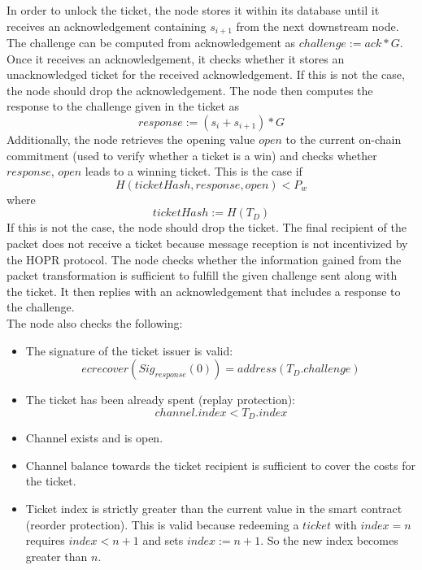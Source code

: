 In order to unlock the ticket, the node stores it within its database until it receives an acknowledgement containing $s_{i+1}$ from the next downstream node. 
The challenge can be computed from acknowledgement as $challenge:=ack*G$.
\newline Once it receives an acknowledgement, it checks whether it stores an unacknowledged ticket for the received acknowledgement. 
If this is not the case, the node should drop the acknowledgement.  
\newline The node then computes the response to the challenge given in the ticket as $$response:=(s_i+s_{i+1})*G$$
Additionally, the node retrieves the opening value $open$ to the current on-chain commitment (used to verify whether a ticket is a win) and checks whether $response$, $open$ leads to a winning ticket. 
This is the case if $$H( ticketHash, response, open ) <P_w$$ where $$ticketHash:=H(T_D)$$
If this is not the case, the node should drop the ticket. 
The final recipient of the packet does not receive a ticket because message reception is not incentivized by the HOPR protocol.
\newline The node checks whether the information gained from the packet transformation is sufficient to fulfill the given challenge sent along with the ticket. It then replies with an acknowledgement that includes a response to the challenge.
\\ The node also checks the following:
\begin{itemize}
    \item The signature of the ticket issuer is valid: $$ecrecover(Sig_{response}(0))=address(T_D.challenge)$$
    \item The ticket has been already spent (replay protection): $$channel.index <T_D.index$$
    \item Channel exists and is open.
    \item Channel balance towards the ticket recipient is sufficient to cover the costs for the ticket.
    \item Ticket index is strictly greater than the current value in the smart contract (reorder protection). This is valid because redeeming a $ticket$ with $index=n$ requires $index < n+1$ and sets $index := n+1$. So the new index becomes greater than $n$.


\end{itemize}  








